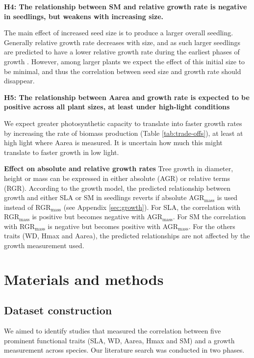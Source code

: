 \documentclass[a4paper,11pt]{article}
\begin{document}
\textbf{H4: The relationship between SM and relative growth rate is negative in seedlings, but weakens with increasing size.}

The main effect of increased seed size is to produce a larger overall seedling. Generally relative growth rate decreases with size, and as such larger seedlings are predicted to have a lower relative growth rate during the earliest phases of growth \citep{Turnbull:2012ew}. However, among larger plants we expect the effect of this initial size to be minimal, and thus the correlation between seed size and growth rate should disappear.

\textbf{H5: The relationship between Aarea and growth rate is expected to be positive across all plant sizes, at least under high-light conditions}

We expect greater photosynthetic capacity to translate into faster growth rates by increasing the rate of biomass production (Table \ref{tab:trade-offs}), at least at high light where Aarea is measured. It is uncertain how much this might translate to faster growth in low light.

\textbf{Effect on absolute and relative growth rates}
Tree growth in diameter, height or mass can be expressed in either absolute (AGR) or relative terms (RGR). According to the growth model, the predicted relationship between growth and either SLA or SM in seedlings reverts if absolute AGR$_\textrm{mass}$ is used instead of RGR$_\textrm{mass}$ (see Appendix \ref{sec:growth}). For SLA, the correlation with RGR$_\textrm{mass}$ is positive but becomes negative with AGR$_\textrm{mass}$. For SM the correlation with RGR$_\textrm{mass}$ is negative but becomes positive with AGR$_\textrm{mass}$. For the others traits (WD, Hmax and Aarea), the predicted relationships are not affected by the growth measurement used.


\section*{Materials and methods}\label{material-and-methods}

\subsection*{Dataset construction}\label{data-construction}

We aimed to identify studies that measured the correlation between five prominent functional traits (SLA, WD, Aarea, Hmax and SM) and a growth measurement across species. Our literature search was conducted in two phases.
\end{document}
